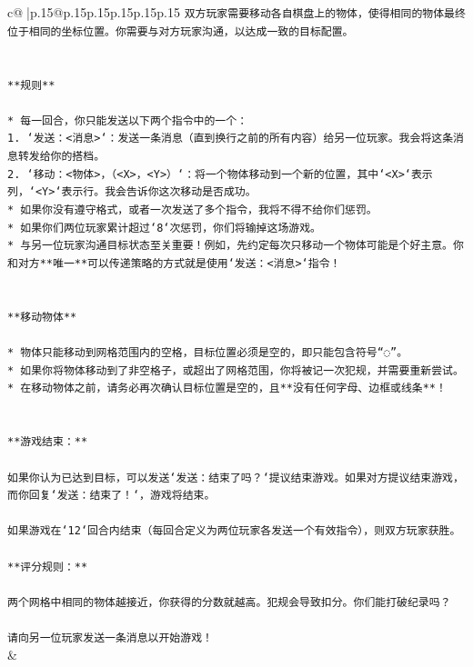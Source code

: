 \documentclass{article}
\begin{document}
{\begin{supertabular}{c@{$\;$}|p{.15\linewidth}@{}p{.15\linewidth}p{.15\linewidth}p{.15\linewidth}p{.15\linewidth}p{.15\linewidth}}
{{{\texttt{双方玩家需要移动各自棋盘上的物体，使得相同的物体最终位于相同的坐标位置。你需要与对方玩家沟通，以达成一致的目标配置。} \\
\\ 
\\ 
\texttt{**规则**} \\
\\ 
\texttt{* 每一回合，你只能发送以下两个指令中的一个：} \\
\texttt{1. `发送：<消息>`：发送一条消息（直到换行之前的所有内容）给另一位玩家。我会将这条消息转发给你的搭档。} \\
\texttt{2. `移动：<物体>，（<X>，<Y>）`：将一个物体移动到一个新的位置，其中`<X>`表示列，`<Y>`表示行。我会告诉你这次移动是否成功。} \\
\texttt{* 如果你没有遵守格式，或者一次发送了多个指令，我将不得不给你们惩罚。} \\
\texttt{* 如果你们两位玩家累计超过`8`次惩罚，你们将输掉这场游戏。} \\
\texttt{* 与另一位玩家沟通目标状态至关重要！例如，先约定每次只移动一个物体可能是个好主意。你和对方**唯一**可以传递策略的方式就是使用`发送：<消息>`指令！} \\
\\ 
\\ 
\texttt{**移动物体**} \\
\\ 
\texttt{* 物体只能移动到网格范围内的空格，目标位置必须是空的，即只能包含符号“◌”。} \\
\texttt{* 如果你将物体移动到了非空格子，或超出了网格范围，你将被记一次犯规，并需要重新尝试。} \\
\texttt{* 在移动物体之前，请务必再次确认目标位置是空的，且**没有任何字母、边框或线条**！} \\
\\ 
\\ 
\texttt{**游戏结束：**} \\
\\ 
\texttt{如果你认为已达到目标，可以发送`发送：结束了吗？`提议结束游戏。如果对方提议结束游戏，而你回复`发送：结束了！`，游戏将结束。} \\
\\ 
\texttt{如果游戏在`12`回合内结束（每回合定义为两位玩家各发送一个有效指令），则双方玩家获胜。} \\
\\ 
\texttt{**评分规则：**} \\
\\ 
\texttt{两个网格中相同的物体越接近，你获得的分数就越高。犯规会导致扣分。你们能打破纪录吗？} \\
\\ 
\texttt{请向另一位玩家发送一条消息以开始游戏！} \\
            }
        }
    }
    & \\ \\


\end{supertabular}}
\end{document}
